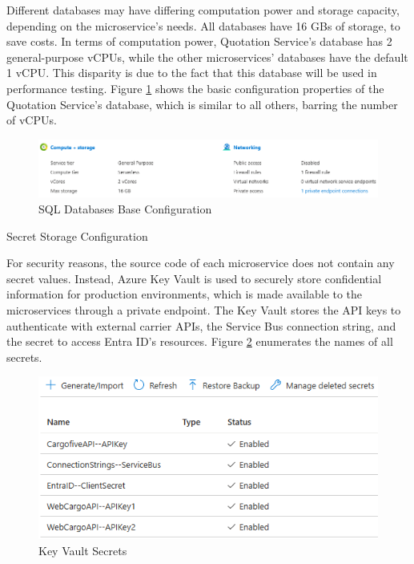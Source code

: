 \documentclass[12pt, reqno]{amsbook}
\makeatletter
\def\subsection{\@startsection{subsection}{2}%
      \z@{.5\linespacing\@plus.7\linespacing}{.25\linespacing}%
      {\normalfont\bfseries\flushleft}}
\theoremstyle{definition}
\theoremstyle{definition}
\numberwithin{section}{chapter}
\numberwithin{table}{chapter}
\numberwithin{figure}{chapter}
\makeatother
\begin{document}
Different databases may have differing computation power and storage capacity, depending on the microservice's needs. All databases have 16 \acp{GB} of storage, to save costs. In terms of computation power, Quotation Service's database has 2 general-purpose \acp{vCPU}, while the other microservices' databases have the default 1 \ac{vCPU}. This disparity is due to the fact that this database will be used in performance testing. Figure \ref{Figure:DatabaseConfigurationBase} shows the basic configuration properties of the Quotation Service's database, which is similar to all others, barring the number of \acp{vCPU}.

\begin{figure}[H]
  \centering
  \includegraphics[width=0.9\linewidth]{images/DatabaseConfigurationBase.png}
  \caption{\label{Figure:DatabaseConfigurationBase}SQL Databases Base Configuration}
\end{figure}

\subsection{Secret Storage Configuration}

For security reasons, the source code of each microservice does not contain any secret values. Instead, Azure Key Vault is used to securely store confidential information for production environments, which is made available to the microservices through a private endpoint. The Key Vault stores the \ac{API} keys to authenticate with external carrier \acp{API}, the Service Bus connection string, and the secret to access Entra ID's resources. Figure \ref{Figure:KeyVaultSecrets} enumerates the names of all secrets.

\begin{figure}[H]
  \centering
  \includegraphics[width=0.8\linewidth]{images/KeyVaultSecrets.png}
  \caption{\label{Figure:KeyVaultSecrets}Key Vault Secrets}
\end{figure}
\end{document}
